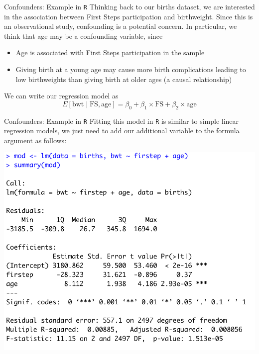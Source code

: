 \documentclass[10pt,t]{beamer}
\begin{document}
\begin{frame}{Confounders: Example in \texttt{R}}
Thinking back to our births dataset, we are interested in the association between First Steps participation and birthweight. Since this is an observational study, confounding is a potential concern. In particular, we think that age may be a confounding variable, since 

\vspace{0.3cm}

\begin{itemize}
	\item Age is associated with First Steps participation in the sample
	\item Giving birth at a young age may cause more birth complications leading to low birthweights than giving birth at older ages (a causal relationship)
\end{itemize} \pause

\vspace{0.3cm}

We can write our regression model as
$$
E[\text{bwt} \mid \text{FS}, \text{age}] = \beta_0 + \beta_1 \times \text{FS} + \beta_2 \times \text{age}
$$
\end{frame}

\begin{frame}{Confounders: Example in \texttt{R}}
Fitting this model in \texttt{R} is similar to simple linear regression models, we just need to add our additional variable to the formula argument as follows:

\vspace{0.3cm}

\centering \includegraphics[scale=0.4]{confound_code.png}
\end{frame}
\end{document}
